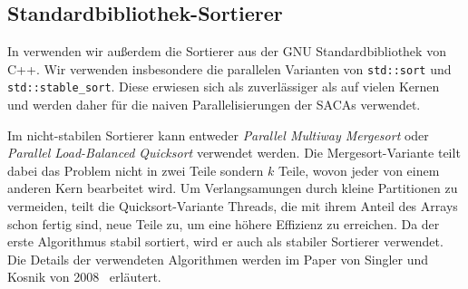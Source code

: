 \subsection{Standardbibliothek-Sortierer}
\label{section:stdsort}

In \sacabench verwenden wir außerdem die Sortierer aus der GNU Standardbibliothek von C++.
Wir verwenden insbesondere die parallelen Varianten von \texttt{std::sort}
und \texttt{std::stable\_sort}.
Diese erwiesen sich als zuverlässiger als \ipsviero auf vielen Kernen
und werden daher für die naiven Parallelisierungen der SACAs verwendet.

Im nicht-stabilen Sortierer kann entweder \emph{Parallel Multiway Mergesort} oder \emph{Parallel Load-Balanced Quicksort} verwendet werden.
Die Mergesort-Variante teilt dabei das Problem nicht in zwei Teile sondern $k$ Teile, wovon jeder von einem anderen Kern bearbeitet wird.
Um Verlangsamungen durch kleine Partitionen zu vermeiden, teilt die Quicksort-Variante Threads,
die mit ihrem Anteil des Arrays schon fertig sind, neue Teile zu, um eine höhere Effizienz zu erreichen.
Da der erste Algorithmus stabil sortiert, wird er auch als stabiler Sortierer verwendet.
Die Details der verwendeten Algorithmen werden im Paper von Singler und Kosnik von 2008~\cite{parallelstdsort} erläutert.